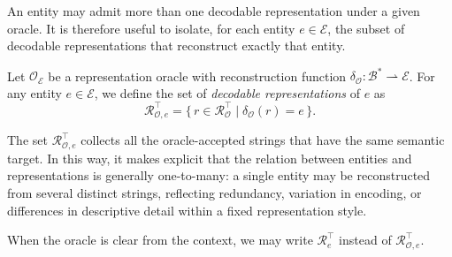 An entity may admit more than one decodable representation under a given oracle. It is therefore useful to isolate, for each entity \(e \in \mathcal{E}\), the subset of decodable representations that reconstruct exactly that entity.

\begin{definition}
Let \(\mathcal{O}_{\mathcal{E}}\) be a representation oracle with reconstruction function
\(\delta_{\mathcal O} : \mathcal{B}^\ast \rightharpoonup \mathcal{E}\). For any entity \(e \in \mathcal{E}\), we define the set of \emph{decodable representations} of \(e\) as
\[
\mathcal{R}_{\mathcal{O}, e}^{\top} = 
\{\, r \in \mathcal{R}_{\mathcal O}^{\top} \mid \delta_{\mathcal O}(r)=e \,\}.
\]
\end{definition}

The set \(\mathcal{R}_{\mathcal{O}, e}^{\top}\) collects all the oracle-accepted strings that have the same semantic target. In this way, it makes explicit that the relation between entities and representations is generally one-to-many: a single entity may be reconstructed from several distinct strings, reflecting redundancy, variation in encoding, or differences in descriptive detail within a fixed representation style.

\begin{notation}
When the oracle is clear from the context, we may write \(\mathcal{R}_{e}^{\top}\) instead of \(\mathcal{R}_{\mathcal{O}, e}^{\top}\).
\end{notation}

